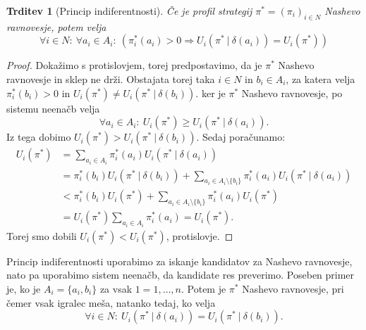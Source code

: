 \documentclass[10pt, a4paper]{article}
\newtheorem{trditev}[izr]{Trditev}
\newenvironment{noticeC}{%
  \tcolorbox[%
  notitle,
  empty,
  enhanced,  %
  breakable,
  coltext=black, 
  fontupper=\rmfamily,
  noparskip,
  sharp corners,
  boxrule=-1pt,  %
  frame hidden,
  left=7pt,  %
  right=7pt,
  top=5pt,
  bottom=5pt,
  before skip=2.5ex plus 2pt,
  after skip=2.5ex plus 2pt,
  overlay unbroken and last={%
  },
  ]}
{\endtcolorbox}
\newenvironment{dokaz}%
  {\begin{noticeC}\begin{proof}}%
  {\end{proof}\end{noticeC}}
\begin{document}
\begin{trditev}[Princip indiferentnosti]
  Če je profil strategij $\pi^* = (\pi_i)_{i \in N}$ Nashevo ravnovesje, potem velja 
  $$\forall i \in N:\ \forall a_i \in A_i:\ \left(\pi_i^* (a_i) > 0 \Rightarrow U_i (\pi^*\ |\ \delta(a_i)) = U_i(\pi^*)\right)$$
\end{trditev}

\begin{dokaz}
  Dokažimo s protislovjem, torej predpostavimo, da je $\pi^*$ Nashevo ravnovesje in sklep ne drži.
  Obstajata torej taka $i \in N$ in $b_i \in A_i$, za katera velja $\pi^*_i (b_i) > 0$ 
  in $U_i (\pi^*) \neq U_i (\pi^*\ |\ \delta(b_i))$. 
  ker je $\pi^*$ Nashevo ravnovesje, po sistemu neenačb velja 
  $$\forall a_i \in A_i:\ U_i (\pi^*) \geq U_i (\pi^*\ |\ \delta(a_i)).$$
  Iz tega dobimo $U_i (\pi^*) > U_i (\pi^*\ |\ \delta(b_i))$.
  Sedaj poračunamo:
  \begin{align*}
    U_i (\pi^*) &= \sum_{a_i \in A_i} \pi^*_i (a_i) U_i (\pi^*\ |\ \delta(a_i))\\
    &= \pi^*_i (b_i) U_i (\pi^*\ |\ \delta(b_i)) + \sum_{a_i \in A_i \setminus \{b_i\}}\pi^*_i (a_i) U_i (\pi^*\ |\ \delta(a_i))\\
    &< \pi^*_i (b_i) U_i(\pi^*) + \sum_{a_i \in A_i \setminus \{b_i\}}\pi^*_i (a_i) U_i (\pi^*)\\
    &= U_i (\pi^*) \sum_{a_i \in A_i} \pi_i ^* (a_i) = U_i (\pi^*).
  \end{align*}
  Torej smo dobili $U_i (\pi^*) < U_i (\pi^*)$, protislovje.
\end{dokaz}

Princip indiferentnosti uporabimo za iskanje kandidatov za Nashevo ravnovesje, nato pa uporabimo 
sistem neenačb, da kandidate res preverimo. Poseben primer je, ko je $A_i = \{a_i, b_i\}$ za vsak $1 = 1, \dots, n$.
Potem je $\pi^*$ Nashevo ravnovesje, pri čemer vsak igralec meša, natanko tedaj, ko velja 
$$\forall i \in N:\ U_i (\pi^*\ |\ \delta(a_i)) = U_i (\pi^*\ |\ \delta(b_i)).$$
\end{document}

